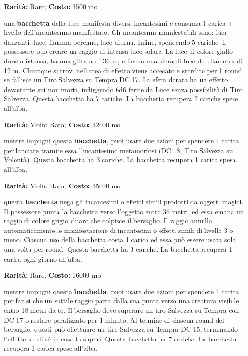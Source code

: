 \begin{multicols}{2}
\textbf{Rarità:} Raro; \textbf{Costo:} 3500 mo

una \textbf{bacchetta} della luce manifesta diversi incantesimi e consuma 1 carica + livello dell'incantesimo manifestato. Gli incantesimi manifestabili sono: luci danzanti, luce, fiamma perenne, luce diurna. Infine, spendendo 5 cariche, il possessore può creare un raggio di intensa luce solare. La luce di colore giallo-dorato intenso, ha una gittata di 36 m, e forma una sfera di luce del diametro di 12 m. Chiunque si trovi nell'area di effetto viene accecato e stordito per 1 round se fallisce un Tiro Salvezza su Tempra DC 17. La sfera dorata ha un effetto devastante sui non morti, infliggendo 6d6 ferite da Luce senza possibilità di Tiro Salvezza. Questa bacchetta ha 7 cariche. La bacchetta recupera 2 cariche spese all'alba.


\textbf{Rarità:} Molto Raro; \textbf{Costo:} 32000 mo

mentre impugni questa \textbf{bacchetta}, puoi usare due azioni per spendere 1 carica per lanciare tramite essa l'incantesimo metamorfosi (DC 18, Tiro Salvezza su Volontà). Questa bacchetta ha 3 cariche. La bacchetta recupera 1 carica spesa all'alba.


\textbf{Rarità:} Molto Raro; \textbf{Costo:} 35000 mo

questa \textbf{bacchetta} nega gli incantesimi o effetti simili prodotti da oggetti magici. Il possessore punta la bacchetta verso l'oggetto entro 36 metri, ed essa emana un raggio di colore grigio chiaro che colpisce il bersaglio. Il raggio annulla automaticamente le manifestazione di incantesimi o effetti simili di livello 3 o meno. Ciascun uso della bacchetta costa 1 carica ed essa può essere usata solo una volta per round. Questa bacchetta ha 3 cariche. La bacchetta recupera 1 carica ogni giorno all'alba.


\textbf{Rarità:} Raro; \textbf{Costo:} 16000 mo

mentre impugni questa \textbf{bacchetta}, puoi usare due azioni per spendere 1 carica per far sì che un sottile raggio parta dalla sua punta verso una creatura visibile entro 18 metri da te. Il bersaglio deve superare un tiro Salvezza su Tempra con DC 17 o restare paralizzato per 1 minuto. Al termine di ciascun round del bersaglio, questi può effettuare un tiro Salvezza su Tempra DC 15, terminando l'effetto su di sé in caso lo superi. Questa bacchetta ha 7 cariche. La bacchetta recupera 1 carica spese all'alba.


\end{multicols}
